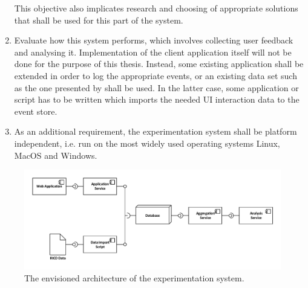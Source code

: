 \begin{enumerate}
This objective also implicates research and choosing of appropriate solutions that shall be used for this part of the system.
\item Evaluate how this system performs, which involves collecting user feedback and analysing it.
Implementation of the client application itself will not be done for the purpose of this thesis.
Instead, some existing application shall be extended in order to log the appropriate events, or an existing data set such as the one presented by \citet{Deka:2017:Rico} shall be used.
In the latter case, some application or script has to be written which imports the needed UI interaction data to the event store.
\item As an additional requirement, the experimentation system shall be platform independent, i.e. run on the most widely used operating systems Linux, MacOS and Windows.
\end{enumerate}

\begin{figure}[htb]
        \includegraphics[width=\textwidth]{gfx/architecture-1}
        \caption{The envisioned architecture of the experimentation system.}
        \label{fig:system:vision}
\end{figure}
